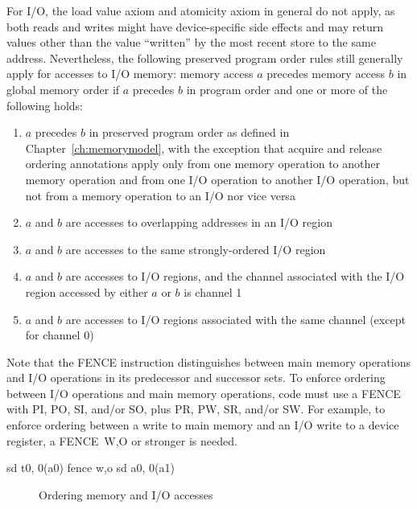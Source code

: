 For I/O, the load value axiom and atomicity axiom in general do not apply, as both reads and writes might have device-specific side effects and may return values other than the value ``written'' by the most recent store to the same address.
Nevertheless, the following preserved program order rules still generally apply for accesses to I/O memory:
memory access $a$ precedes memory access $b$ in global memory order if $a$ precedes $b$ in program order and one or more of the following holds:
\begin{enumerate}
  \item $a$ precedes $b$ in preserved program order as defined in Chapter~\ref{ch:memorymodel}, with the exception that acquire and release ordering annotations apply only from one memory operation to another memory operation and from one I/O operation to another I/O operation, but not from a memory operation to an I/O nor vice versa
  \item $a$ and $b$ are accesses to overlapping addresses in an I/O region
  \item $a$ and $b$ are accesses to the same strongly-ordered I/O region
  \item $a$ and $b$ are accesses to I/O regions, and the channel associated with the I/O region accessed by either $a$ or $b$ is channel 1
  \item $a$ and $b$ are accesses to I/O regions associated with the same channel (except for channel 0)
\end{enumerate}

Note that the FENCE instruction distinguishes between main memory operations and I/O operations in its predecessor and successor sets.
To enforce ordering between I/O operations and main memory operations, code must use a FENCE with PI, PO, SI, and/or SO, plus PR, PW, SR, and/or SW.
For example, to enforce ordering between a write to main memory and an I/O write to a device register, a FENCE~W,O or stronger is needed.

\begin{verbbox}
  sd t0, 0(a0)
  fence w,o
  sd a0, 0(a1)
\end{verbbox}
\begin{figure}[h!]
  \centering\small
  \theverbbox
  \caption{Ordering memory and I/O accesses}
  \label{fig:litmus:wo}
\end{figure}

